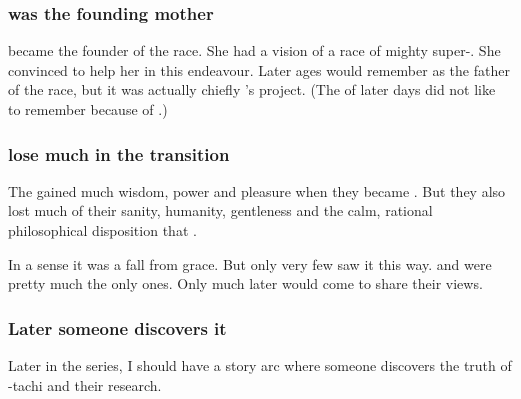 \subsubsection{\Tiamat was the founding mother}
\Tiamat became the founder of the \draconian race.
She had a vision of a race of mighty super-\ophidians.
She convinced \Sethicus to help her in this endeavour.
Later ages would remember \Sethicus as the father of the \draconian race, but it was actually chiefly \Tiamat's project.
(The \dragons of later days did not like to remember \Tiamat because of .)





\subsubsection{\Dragons lose much in the transition}
The \dragons gained much wisdom, power and pleasure when they became \dragons. 
But they also lost much of their sanity, humanity, gentleness and the calm, rational philosophical disposition that . 

In a sense it was a fall from grace. 
But only very few \dragons saw it this way. 
\Iurzmacul and \Nexagglachel were pretty much the only ones. 
Only much later would \Ishnaruchaefir come to share their views.





\subsubsection{Later someone discovers it}
Later in the series, I should have a story arc where someone discovers the truth of \Sethicus-tachi and their research. 

